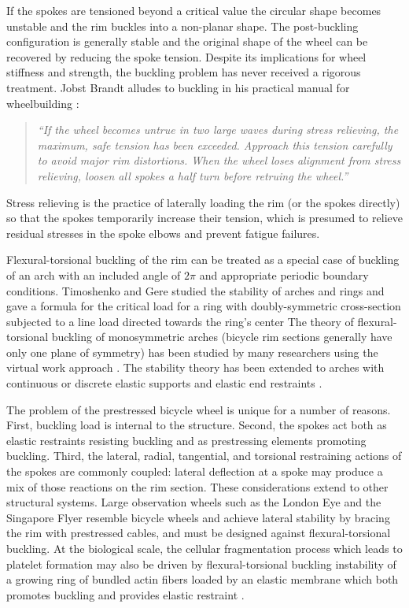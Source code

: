 \documentclass[\rootdir/thesis.tex]{subfiles}
\begin{document}
If the spokes are tensioned beyond a critical value the circular shape becomes unstable and the rim buckles into a non-planar shape. The post-buckling configuration is generally stable and the original shape of the wheel can be recovered by reducing the spoke tension. Despite its implications for wheel stiffness and strength, the buckling problem has never received a rigorous treatment. Jobst Brandt alludes to buckling in his practical manual for wheelbuilding \cite{Brandt1993}:

\begin{quote}
\emph{``If the wheel becomes untrue in two large waves during stress relieving, the maximum, safe tension has been exceeded. Approach this tension carefully to avoid major rim distortions. When the wheel loses alignment from stress relieving, loosen all spokes a half turn before retruing the wheel.''}
\end{quote}

Stress relieving is the practice of laterally loading the rim (or the spokes directly) so that the spokes temporarily increase their tension, which is presumed to relieve residual stresses in the spoke elbows and prevent fatigue failures.

Flexural-torsional buckling of the rim can be treated as a special case of buckling of an arch with an included angle of $2\pi$ and appropriate periodic boundary conditions. Timoshenko and Gere \cite{Timoshenko1961} studied the stability of arches and rings and gave a formula for the critical load for a ring with doubly-symmetric cross-section subjected to a line load directed towards the ring's center The theory of flexural-torsional buckling of monosymmetric arches (bicycle rim sections generally have only one plane of symmetry) has been studied by many researchers using the virtual work approach \cite{Yoo1982,Trahair1987,Pi1992,Kang1994,Pi1995,Lim2004,Ryu2012}. The stability theory has been extended to arches with continuous \cite{Pi2002} or discrete \cite{Bradford2002} elastic supports and elastic end restraints \cite{Guo2014}.

The problem of the prestressed bicycle wheel is unique for a number of reasons. First, buckling load is internal to the structure. Second, the spokes act both as elastic restraints resisting buckling and as prestressing elements promoting buckling. Third, the lateral, radial, tangential, and torsional restraining actions of the spokes are commonly coupled: lateral deflection at a spoke may produce a mix of those reactions on the rim section. These considerations extend to other structural systems. Large observation wheels such as the London Eye \cite{Mann2001} and the Singapore Flyer \cite{Allsop2009} resemble bicycle wheels and achieve lateral stability by bracing the rim with prestressed cables, and must be designed against flexural-torsional buckling. At the biological scale, the cellular fragmentation process which leads to platelet formation may also be driven by flexural-torsional buckling instability of a growing ring of bundled actin fibers loaded by an elastic membrane which both promotes buckling and provides elastic restraint \cite{Stroberg2016}.
\end{document}
